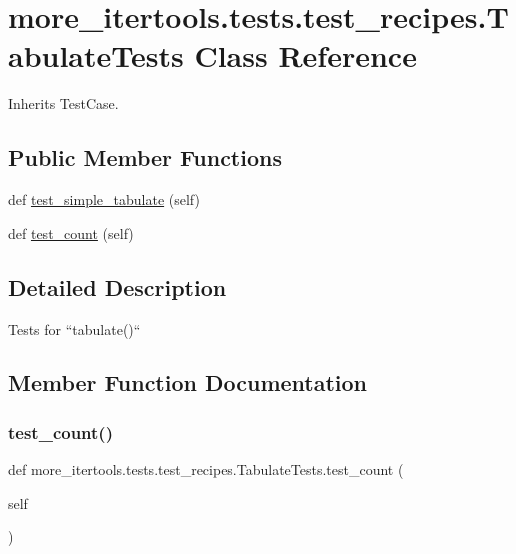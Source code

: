 \hypertarget{classmore__itertools_1_1tests_1_1test__recipes_1_1_tabulate_tests}{}\section{more\+\_\+itertools.\+tests.\+test\+\_\+recipes.\+Tabulate\+Tests Class Reference}
\label{classmore__itertools_1_1tests_1_1test__recipes_1_1_tabulate_tests}


Inherits Test\+Case.

\subsection*{Public Member Functions}
\begin{DoxyCompactItemize}
\item 
def \hyperlink{classmore__itertools_1_1tests_1_1test__recipes_1_1_tabulate_tests_ad172dc88d66f6eb9b466c5d08fcf176c}{test\+\_\+simple\+\_\+tabulate} (self)
\item 
def \hyperlink{classmore__itertools_1_1tests_1_1test__recipes_1_1_tabulate_tests_a58c9947d33365c6e9a60a280e616cb5d}{test\+\_\+count} (self)
\end{DoxyCompactItemize}


\subsection{Detailed Description}
\begin{DoxyVerb}Tests for ``tabulate()``\end{DoxyVerb}
 

\subsection{Member Function Documentation}
\mbox{\label{classmore__itertools_1_1tests_1_1test__recipes_1_1_tabulate_tests_a58c9947d33365c6e9a60a280e616cb5d}} 
\subsubsection{\texorpdfstring{test\+\_\+count()}{test\_count()}}
{\footnotesize\ttfamily def more\+\_\+itertools.\+tests.\+test\+\_\+recipes.\+Tabulate\+Tests.\+test\+\_\+count (\begin{DoxyParamCaption}\item[{}]{self }\end{DoxyParamCaption})}

